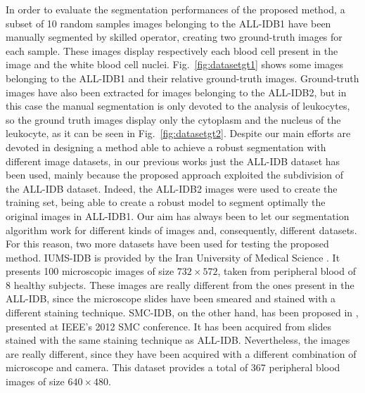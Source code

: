 \documentclass[final,a4paper,12pt,english]{UnicaPhdThesis3}
\begin{document}
In order to evaluate the segmentation performances of the proposed method, a subset of 10 random samples images belonging to the ALL-IDB1 have been manually segmented by skilled operator, creating two ground-truth images for each sample. These images display respectively each blood cell present in the image and the white blood cell nuclei. Fig.~\ref{fig:datasetgt1} shows some images belonging to the ALL-IDB1 and their relative ground-truth images. Ground-truth images have also been extracted for images belonging to the ALL-IDB2, but in this case the manual segmentation is only devoted to the analysis of leukocytes, so the ground truth images display only the cytoplasm and the nucleus of the leukocyte, as it can be seen in Fig.~\ref{fig:datasetgt2}.
Despite our main efforts are devoted in designing a method able to achieve a robust segmentation with different image datasets, in our previous works \cite{Put15c,Put15d}  just the ALL-IDB dataset has been used, mainly because the proposed approach exploited the subdivision of the ALL-IDB dataset. Indeed, the ALL-IDB2 images were used to create the training set, being able to create a robust model to segment optimally the original images in ALL-IDB1. Our aim has always been to let our segmentation algorithm work for different kinds of images and, consequently, different datasets. 
For this reason, two more datasets have been used for testing the proposed method. 
IUMS-IDB is provided by the Iran University of Medical Science \cite{Sarrafzadeh}. It presents 100 microscopic images of size $732 \times 572$, taken from peripheral blood of 8 healthy subjects. These images are really different from the ones present in the ALL-IDB, since the microscope slides have been smeared and stained with a different staining technique. SMC-IDB, on the other hand, has been proposed in \cite{Mohamed}, presented at IEEE's 2012 SMC conference. It has been acquired from slides stained with the same staining technique as ALL-IDB. Nevertheless, the images are really different, since they have been acquired with a different combination of microscope and camera. This dataset provides a total of 367 peripheral blood images of size $640 \times 480$.

\newpage
\end{document}
